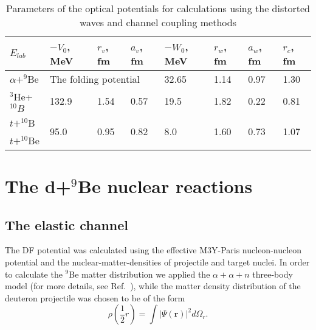 \documentclass[
12pt, %
oneside, %
english, %
onehalfspacing, %
onehalfspacing, %
headsepline, %
]{MastersDoctoralThesis} %
\begin{document}
\begin{table}[bp]
\caption{\footnotesize Parameters of the optical potentials for calculations using the distorted waves and channel coupling methods}
\label{abe_tab2}
\centering
\footnotesize
\begin{tabular}{@{}llllllll@{}}
\toprule
$E_{lab}$       & $-V_0$, MeV           & $r_v$, fm             & $a_v$, fm             & $-W_0$, MeV          & $r_w$, fm             & $a_w$, fm             & $r_c$, fm             \\ \midrule
$\alpha+^9$Be   & \multicolumn{3}{l}{The folding potential}                             & 32.65                & 1.14                  & 0.97                  & 1.30                  \\
$^3$He+$^{10}B$ & 132.9                 & 1.54                  & 0.57                  & 19.5                 & 1.82                  & 0.22                  & 0.81                  \\
$t+^{10}$B      & \multirow{2}{*}{95.0} & \multirow{2}{*}{0.95} & \multirow{2}{*}{0.82} & \multirow{2}{*}{8.0} & \multirow{2}{*}{1.60} & \multirow{2}{*}{0.73} & \multirow{2}{*}{1.07} \\
$t+^{10}$Be     &                       &                       &                       &                      &                       &                       &                       \\ \bottomrule
\end{tabular}
\end{table}

\section{The d+$^9$Be nuclear reactions}

\subsection{The elastic channel}
The DF potential was calculated using the effective M3Y-Paris nucleon-nucleon potential and the nuclear-matter-densities of projectile and target nuclei. In order to calculate the ${}^9$Be matter distribution we applied the $\alpha+\alpha+n$ three-body model (for more details, see Ref.~\cite{urazbekov2016}), while the matter density distribution of the deuteron projectile was chosen to be of the form
\begin{equation}
\rho\left( \frac{1}{2}r \right) =\int \vert \Psi (\textbf{r}) \vert ^2 d \Omega_r.
\end{equation}
\end{document}
